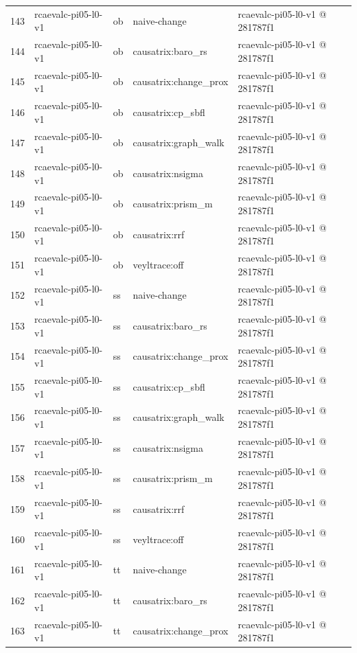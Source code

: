 \begin{longtable}{@{}r>{\raggedright\arraybackslash}p{87.0pt}>{\raggedright\arraybackslash}p{18.0pt}>{\raggedright\arraybackslash}p{63.0pt}>{\raggedright\arraybackslash}p{108.0pt}@{}}
143 & rcaevalc-pi05-l0-v1 & ob & naive-change & rcaevalc-pi05-l0-v1 @ 281787f1 \\
144 & rcaevalc-pi05-l0-v1 & ob & causatrix:baro\_rs & rcaevalc-pi05-l0-v1 @ 281787f1 \\
145 & rcaevalc-pi05-l0-v1 & ob & causatrix:change\_prox & rcaevalc-pi05-l0-v1 @ 281787f1 \\
146 & rcaevalc-pi05-l0-v1 & ob & causatrix:cp\_sbfl & rcaevalc-pi05-l0-v1 @ 281787f1 \\
147 & rcaevalc-pi05-l0-v1 & ob & causatrix:graph\_walk & rcaevalc-pi05-l0-v1 @ 281787f1 \\
148 & rcaevalc-pi05-l0-v1 & ob & causatrix:nsigma & rcaevalc-pi05-l0-v1 @ 281787f1 \\
149 & rcaevalc-pi05-l0-v1 & ob & causatrix:prism\_m & rcaevalc-pi05-l0-v1 @ 281787f1 \\
150 & rcaevalc-pi05-l0-v1 & ob & causatrix:rrf & rcaevalc-pi05-l0-v1 @ 281787f1 \\
151 & rcaevalc-pi05-l0-v1 & ob & veyltrace:off & rcaevalc-pi05-l0-v1 @ 281787f1 \\
152 & rcaevalc-pi05-l0-v1 & ss & naive-change & rcaevalc-pi05-l0-v1 @ 281787f1 \\
153 & rcaevalc-pi05-l0-v1 & ss & causatrix:baro\_rs & rcaevalc-pi05-l0-v1 @ 281787f1 \\
154 & rcaevalc-pi05-l0-v1 & ss & causatrix:change\_prox & rcaevalc-pi05-l0-v1 @ 281787f1 \\
155 & rcaevalc-pi05-l0-v1 & ss & causatrix:cp\_sbfl & rcaevalc-pi05-l0-v1 @ 281787f1 \\
156 & rcaevalc-pi05-l0-v1 & ss & causatrix:graph\_walk & rcaevalc-pi05-l0-v1 @ 281787f1 \\
157 & rcaevalc-pi05-l0-v1 & ss & causatrix:nsigma & rcaevalc-pi05-l0-v1 @ 281787f1 \\
158 & rcaevalc-pi05-l0-v1 & ss & causatrix:prism\_m & rcaevalc-pi05-l0-v1 @ 281787f1 \\
159 & rcaevalc-pi05-l0-v1 & ss & causatrix:rrf & rcaevalc-pi05-l0-v1 @ 281787f1 \\
160 & rcaevalc-pi05-l0-v1 & ss & veyltrace:off & rcaevalc-pi05-l0-v1 @ 281787f1 \\
161 & rcaevalc-pi05-l0-v1 & tt & naive-change & rcaevalc-pi05-l0-v1 @ 281787f1 \\
162 & rcaevalc-pi05-l0-v1 & tt & causatrix:baro\_rs & rcaevalc-pi05-l0-v1 @ 281787f1 \\
163 & rcaevalc-pi05-l0-v1 & tt & causatrix:change\_prox & rcaevalc-pi05-l0-v1 @ 281787f1 \\

\end{longtable}
